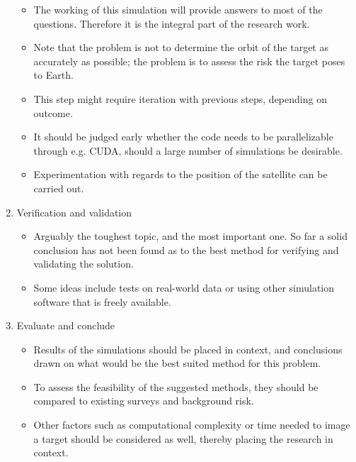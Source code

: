 \begin{enumerate}
    \begin{itemize}
        \item The working of this simulation will provide answers to most of the questions. Therefore it is the integral part of the research work.
        \item Note that the problem is not to determine the orbit of the target as accurately as possible; the problem is to assess the risk the target poses to Earth.
        \item This step might require iteration with previous steps, depending on outcome.
        \item It should be judged early whether the code needs to be parallelizable through e.g. CUDA, should a large number of simulations be desirable.
        \item Experimentation with regards to the position of the satellite can be carried out.
    \end{itemize}
    \item Verification and validation
    \begin{itemize}
        \item Arguably the toughest topic, and the most important one. So far a solid conclusion has not been found as to the best method for verifying and validating the solution.
        \item Some ideas include tests on real-world data or using other simulation software that is freely available.
    \end{itemize}
    \item Evaluate and conclude
    \begin{itemize}
        \item Results of the simulations should be placed in context, and conclusions drawn on what would be the best suited method for this problem.
        \item To assess the feasibility of the suggested methods, they should be compared to existing surveys and background risk.
        \item Other factors such as computational complexity or time needed to image a target should be considered as well, thereby placing the research in context.
    \end{itemize}
\end{enumerate}

\newpage


